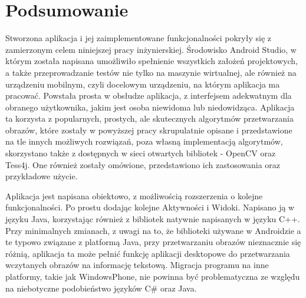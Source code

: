 \documentclass[eng,oneside]{mgr}
\begin{document}
\chapter{Podsumowanie}
Stworzona aplikacja i jej zaimplementowane funkcjonalności pokryły się z zamierzonym celem niniejszej pracy inżynierskiej. Środowisko Android Studio, w którym została napisana umożliwiło spełnienie wszystkich założeń projektowych, a także przeprowadzanie testów nie tylko na maszynie wirtualnej, ale również na urządzeniu mobilnym, czyli docelowym urządzeniu, na którym aplikacja ma pracować. Powstała prosta w obsłudze aplikacja, z interfejsem adekwatnym dla obranego użytkownika, jakim jest osoba niewidoma lub niedowidząca. Aplikacja ta korzysta z popularnych, prostych, ale skutecznych algorytmów przetwarzania obrazów, które zostały w powyższej pracy skrupulatnie opisane i przedstawione na tle innych możliwych rozwiązań, poza własną implementacją algorytmów, skorzystano także z dostępnych w sieci otwartych bibliotek - OpenCV oraz Tess4j. One również zostały omówione, przedstawiono ich zastosowania oraz przykładowe użycie.
\par Aplikacja jest napisana obiektowo, z możliwością rozszerzenia o kolejne funkcjonalności. Po prostu dodając kolejne Aktywności i Widoki. Napisano ją w języku Java, korzystając również z bibliotek natywnie napisanych w języku C++. Przy minimalnych zmianach, z uwagi na to, że biblioteki używane w Androidzie a te typowo związane z platformą Java, przy przetwarzaniu obrazów nieznacznie się różnią, aplikacja ta może pełnić funkcję aplikacji desktopowe do przetwarzania wczytanych obrazów na informację tekstową. Migracja programu na inne platformy, takie jak WindowsPhone, nie powinna być problematyczna ze względu na niebotyczne podobieństwo języków C\# oraz Java.
\end{document}
